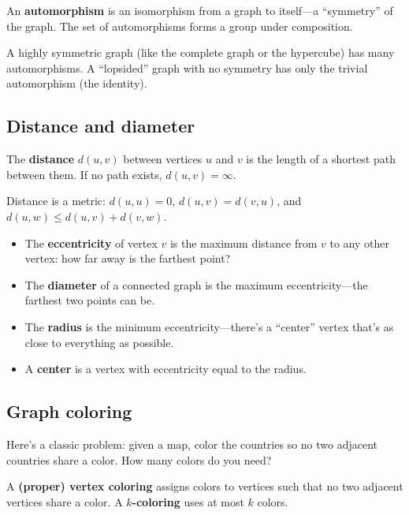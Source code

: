 \begin{definition}[Automorphism]
An \textbf{automorphism} is an isomorphism from a graph to itself---a ``symmetry'' of the graph. The set of automorphisms forms a group under composition.
\end{definition}

A highly symmetric graph (like the complete graph or the hypercube) has many automorphisms. A ``lopsided'' graph with no symmetry has only the trivial automorphism (the identity).

\subsection*{Distance and diameter}

\begin{definition}[Distance]
The \textbf{distance} $d(u, v)$ between vertices $u$ and $v$ is the length of a shortest path between them. If no path exists, $d(u, v) = \infty$.
\end{definition}

Distance is a metric: $d(u,u) = 0$, $d(u,v) = d(v,u)$, and $d(u,w) \leq d(u,v) + d(v,w)$.

\begin{definition}
\begin{itemize}
  \item The \textbf{eccentricity} of vertex $v$ is the maximum distance from $v$ to any other vertex: how far away is the farthest point?
  \item The \textbf{diameter} of a connected graph is the maximum eccentricity---the farthest two points can be.
  \item The \textbf{radius} is the minimum eccentricity---there's a ``center'' vertex that's as close to everything as possible.
  \item A \textbf{center} is a vertex with eccentricity equal to the radius.
\end{itemize}
\end{definition}

\subsection*{Graph coloring}

Here's a classic problem: given a map, color the countries so no two adjacent countries share a color. How many colors do you need?

\begin{definition}
A \textbf{(proper) vertex coloring} assigns colors to vertices such that no two adjacent vertices share a color. A \textbf{$k$-coloring} uses at most $k$ colors.
\end{definition}

